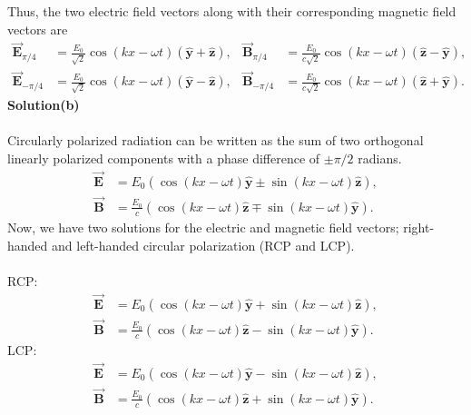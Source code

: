 \documentclass[12pt,a4paper]{article}
\begin{document}
Thus, the two electric field vectors along with their corresponding magnetic field vectors are
\begin{equation}
\begin{aligned}
    \boldsymbol{\Vec{E}}_{\pi/4} &= \frac{E_0}{\sqrt{2}}\cos(kx-\omega t)(\boldsymbol{\hat{y}}+\boldsymbol{\hat{z}}), 
    & \boldsymbol{\Vec{B}}_{\pi/4} &= \frac{E_0}{c\sqrt{2}}\cos(kx-\omega t)(\boldsymbol{\hat{z}}-\boldsymbol{\hat{y}}), \\
    \boldsymbol{\Vec{E}}_{-\pi/4} &= \frac{E_0}{\sqrt{2}}\cos(kx-\omega t)(\boldsymbol{\hat{y}}-\boldsymbol{\hat{z}}), 
    & \boldsymbol{\Vec{B}}_{-\pi/4} &= \frac{E_0}{c\sqrt{2}}\cos(kx-\omega t)(\boldsymbol{\hat{z}}+\boldsymbol{\hat{y}}).
\end{aligned}
\end{equation}
\textbf{Solution(b)}
\\
\\Circularly polarized radiation can be written as the sum of two orthogonal linearly polarized components with a phase difference of $\pm\pi/2$ radians.
\begin{equation}
    \begin{aligned}
        \boldsymbol{\Vec{E}}&=E_0\left(\cos(kx-\omega t)\boldsymbol{\hat{y}}\pm\sin(kx-\omega t)\boldsymbol{\hat{z}}\right), \\
        \boldsymbol{\Vec{B}}&=\frac{E_0}{c}\left(\cos(kx-\omega t)\boldsymbol{\hat{z}}\mp\sin(kx-\omega t)\boldsymbol{\hat{y}}\right).
    \end{aligned}
\end{equation}
Now, we have two solutions for the electric and magnetic field vectors; right-handed and left-handed circular polarization (RCP and LCP).
\\
\\RCP:
\begin{equation}
    \begin{aligned}
        \boldsymbol{\vec{E}}&=E_0\left(\cos(kx-\omega t)\boldsymbol{\hat{y}}+\sin(kx-\omega t)\boldsymbol{\hat{z}}\right), \\
        \boldsymbol{\vec{B}}&=\frac{E_0}{c}\left(\cos(kx-\omega t)\boldsymbol{\hat{z}}-\sin(kx-\omega t)\boldsymbol{\hat{y}}\right).
    \end{aligned}
\end{equation}
LCP:
\begin{equation}
    \begin{aligned}
        \boldsymbol{\vec{E}}&=E_0\left(\cos(kx-\omega t)\boldsymbol{\hat{y}}-\sin(kx-\omega t)\boldsymbol{\hat{z}}\right), \\
        \boldsymbol{\vec{B}}&=\frac{E_0}{c}\left(\cos(kx-\omega t)\boldsymbol{\hat{z}}+\sin(kx-\omega t)\boldsymbol{\hat{y}}\right).
    \end{aligned}
\end{equation}
\end{document}
